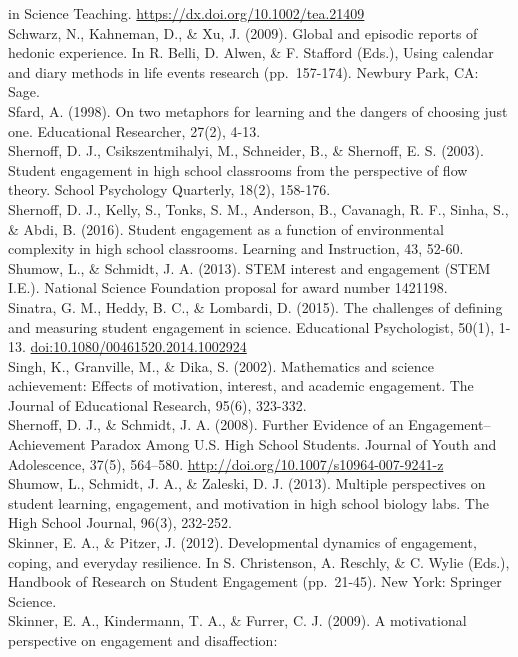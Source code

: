 \documentclass[]{book}
\theoremstyle{definition}
\theoremstyle{definition}
\theoremstyle{definition}
\theoremstyle{remark}
\begin{document}
in Science Teaching. \url{https://dx.doi.org/10.1002/tea.21409}\\
Schwarz, N., Kahneman, D., \& Xu, J. (2009). Global and episodic reports
of hedonic experience. In R. Belli, D. Alwen, \& F. Stafford (Eds.),
Using calendar and diary methods in life events research (pp.~157-174).
Newbury Park, CA: Sage.\\
Sfard, A. (1998). On two metaphors for learning and the dangers of
choosing just one. Educational Researcher, 27(2), 4-13.\\
Shernoff, D. J., Csikszentmihalyi, M., Schneider, B., \& Shernoff, E. S.
(2003). Student engagement in high school classrooms from the
perspective of flow theory. School Psychology Quarterly, 18(2),
158-176.\\
Shernoff, D. J., Kelly, S., Tonks, S. M., Anderson, B., Cavanagh, R. F.,
Sinha, S., \& Abdi, B. (2016). Student engagement as a function of
environmental complexity in high school classrooms. Learning and
Instruction, 43, 52-60.\\
Shumow, L., \& Schmidt, J. A. (2013). STEM interest and engagement (STEM
I.E.). National Science Foundation proposal for award number 1421198.\\
Sinatra, G. M., Heddy, B. C., \& Lombardi, D. (2015). The challenges of
defining and measuring student engagement in science. Educational
Psychologist, 50(1), 1-13. \url{doi:10.1080/00461520.2014.1002924}\\
Singh, K., Granville, M., \& Dika, S. (2002). Mathematics and science
achievement: Effects of motivation, interest, and academic engagement.
The Journal of Educational Research, 95(6), 323-332.\\
Shernoff, D. J., \& Schmidt, J. A. (2008). Further Evidence of an
Engagement--Achievement Paradox Among U.S. High School Students. Journal
of Youth and Adolescence, 37(5), 564--580.
\url{http://doi.org/10.1007/s10964-007-9241-z}\\
Shumow, L., Schmidt, J. A., \& Zaleski, D. J. (2013). Multiple
perspectives on student learning, engagement, and motivation in high
school biology labs. The High School Journal, 96(3), 232-252.\\
Skinner, E. A., \& Pitzer, J. (2012). Developmental dynamics of
engagement, coping, and everyday resilience. In S. Christenson, A.
Reschly, \& C. Wylie (Eds.), Handbook of Research on Student Engagement
(pp.~21-45). New York: Springer Science.\\
Skinner, E. A., Kindermann, T. A., \& Furrer, C. J. (2009). A
motivational perspective on engagement and disaffection:
\end{document}
